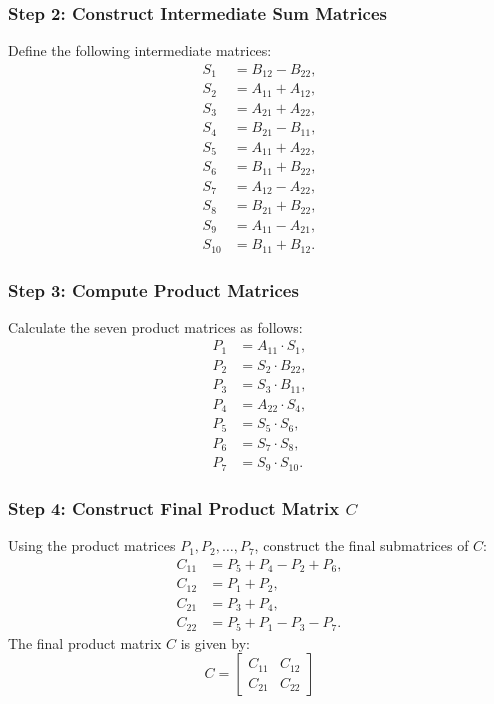     \subsubsection*{Step 2: Construct Intermediate Sum Matrices}
    Define the following intermediate matrices:
    \[
    \begin{aligned}
        S_1 &= B_{12} - B_{22}, \\
        S_2 &= A_{11} + A_{12}, \\
        S_3 &= A_{21} + A_{22}, \\
        S_4 &= B_{21} - B_{11}, \\
        S_5 &= A_{11} + A_{22}, \\
        S_6 &= B_{11} + B_{22}, \\
        S_7 &= A_{12} - A_{22}, \\
        S_8 &= B_{21} + B_{22}, \\
        S_9 &= A_{11} - A_{21}, \\
        S_{10} &= B_{11} + B_{12}.
    \end{aligned}
    \]
    
    \subsubsection*{Step 3: Compute Product Matrices}
    Calculate the seven product matrices as follows:
    \[
    \begin{aligned}
        P_1 &= A_{11} \cdot S_1, \\
        P_2 &= S_2 \cdot B_{22}, \\
        P_3 &= S_3 \cdot B_{11}, \\
        P_4 &= A_{22} \cdot S_4, \\
        P_5 &= S_5 \cdot S_6, \\
        P_6 &= S_7 \cdot S_8, \\
        P_7 &= S_9 \cdot S_{10}.
    \end{aligned}
    \]
    
    \subsubsection*{Step 4: Construct Final Product Matrix \(C\)}
    Using the product matrices \(P_1, P_2, \dots, P_7\), construct the final submatrices of \(C\):
    \[
    \begin{aligned}
        C_{11} &= P_5 + P_4 - P_2 + P_6, \\
        C_{12} &= P_1 + P_2, \\
        C_{21} &= P_3 + P_4, \\
        C_{22} &= P_5 + P_1 - P_3 - P_7.
    \end{aligned}
    \]
    The final product matrix \(C\) is given by:
    \[
    C = \begin{bmatrix} C_{11} & C_{12} \\ C_{21} & C_{22} \end{bmatrix}
    \]
    
